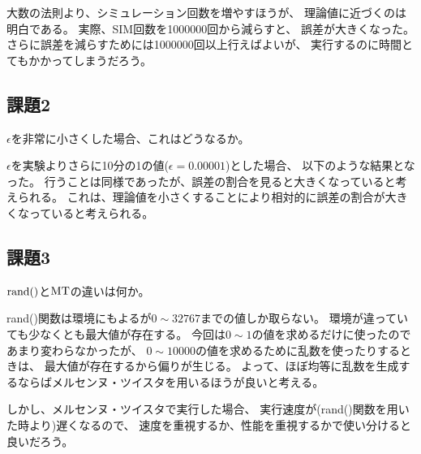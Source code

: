 \documentclass[12pt]{jarticle}
\begin{document}
大数の法則より、シミュレーション回数を増やすほうが、
理論値に近づくのは明白である。
実際、SIM回数を1000000回から減らすと、
誤差が大きくなった。
さらに誤差を減らすためには1000000回以上行えばよいが、
実行するのに時間とてもかかってしまうだろう。

\subsection{課題2}
\begin{shadebox}
    $\epsilon$を非常に小さくした場合、これはどうなるか。
\end{shadebox}

$\epsilon$を実験よりさらに10分の1の値($\epsilon=0.00001$)とした場合、
以下のような結果となった。
行うことは同様であったが、誤差の割合を見ると大きくなっていると考えられる。
これは、理論値を小さくすることにより相対的に誤差の割合が大きくなっていると考えられる。


\clearpage

\subsection{課題3}
\begin{shadebox}
    $\rm{rand()}$と$\rm{MT}$の違いは何か。
\end{shadebox}

rand()関数は環境にもよるが$0\sim 32767$までの値しか取らない。
環境が違っていても少なくとも最大値が存在する。
今回は$0\sim 1$の値を求めるだけに使ったのであまり変わらなかったが、
$0\sim 10000$の値を求めるために乱数を使ったりするときは、
最大値が存在するから偏りが生じる。
よって、ほぼ均等に乱数を生成するならばメルセンヌ・ツイスタを用いるほうが良いと考える。

しかし、メルセンヌ・ツイスタで実行した場合、
実行速度が(rand()関数を用いた時より)遅くなるので、
速度を重視するか、性能を重視するかで使い分けると良いだろう。

\clearpage
\appendix
\end{document}
